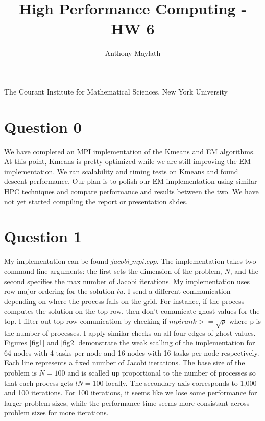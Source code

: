 \documentclass[10pt]{article}
\title{High Performance Computing - HW 6}
\author{Anthony Maylath}
\begin{document}
\maketitle

\begin{center}

The Courant Institute for Mathematical Sciences, New York University \\ 

\end{center}

\setcounter{MaxMatrixCols}{13}

\section{Question 0}

We have completed an MPI implementation of the Kmeans and EM algorithms. At this point, Kmeans is pretty optimized while we are still improving the EM implementation. We ran scalability and timing tests on Kmeans and found descent performance. Our plan is to polish our EM  implementation using similar HPC techniques and compare performance and results between the two. We have not yet started compiling the report or presentation slides.

\section{Question 1}

My implementation can be found $jacobi\_mpi.cpp$. The implementation takes two command line arguments: the first sets the dimension of the problem, $N$, and the second specifies the max number of Jacobi iterations. My implementation uses row major ordering for the solution $lu$. I send a different communication depending on where the process falls on the grid. For instance, if the process computes the solution on the top row, then don't comunicate ghost values for the top. I filter out top row comunication by checking if $mpirank >= \sqrt{p}$ where p is the number of processes. I apply similar checks on all four edges of ghost values.\\

Figures \ref{fig1} and \ref{fig2} demonstrate the weak scalling of the implementation for 64 nodes with 4 tasks per node and 16 nodes with 16 tasks per node respectively. Each line represents a fixed number of Jacobi iterations. The base size of the problem is $N=100$ and is scalled up proportional to the number of processes so that each process gets $lN = 100$ locally. The secondary axis corresponds to 1,000 and 100 iterations. For 100 iterations, it seems like we lose some performance for larger problem sizes, while the performance time seems more consistant across problem sizes for more iterations.\\
\end{document}
